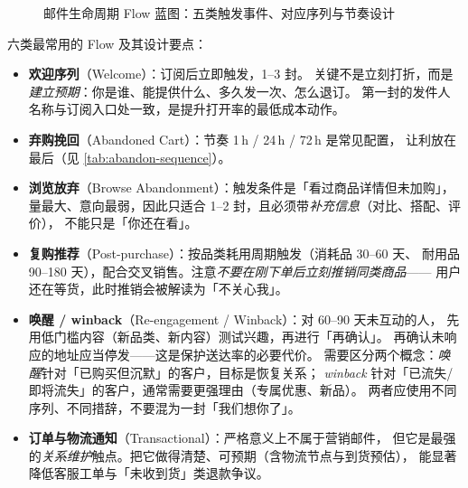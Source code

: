 \begin{figure}[htbp]
\caption{邮件生命周期 Flow 蓝图：五类触发事件、对应序列与节奏设计}
\label{fig:email-flow}
\end{figure}

六类最常用的 Flow 及其设计要点：

\begin{itemize}
  \item \textbf{欢迎序列}（Welcome）：订阅后立即触发，1--3 封。
        关键不是立刻打折，而是\emph{建立预期}：你是谁、能提供什么、多久发一次、怎么退订。
        第一封的发件人名称与订阅入口处一致，是提升打开率的最低成本动作。
  \item \textbf{弃购挽回}（Abandoned Cart）：节奏 1\,h / 24\,h / 72\,h 是常见配置，
        让利放在最后（见 \cref{tab:abandon-sequence}）。
  \item \textbf{浏览放弃}（Browse Abandonment）：触发条件是「看过商品详情但未加购」，
        量最大、意向最弱，因此只适合 1--2 封，且必须带\emph{补充信息}（对比、搭配、评价），
        不能只是「你还在看」。
  \item \textbf{复购推荐}（Post-purchase）：按品类耗用周期触发（消耗品 30--60 天、
        耐用品 90--180 天），配合交叉销售。注意\emph{不要在刚下单后立刻推销同类商品}——
        用户还在等货，此时推销会被解读为「不关心我」。
  \item \textbf{唤醒 / winback}（Re-engagement / Winback）：对 60--90 天未互动的人，
        先用低门槛内容（新品类、新内容）测试兴趣，再进行「再确认」。
        再确认未响应的地址应当停发——这是保护送达率的必要代价。
        需要区分两个概念：\emph{唤醒}针对「已购买但沉默」的客户，目标是恢复关系；
        \emph{winback} 针对「已流失/即将流失」的客户，通常需要更强理由（专属优惠、新品）。
        两者应使用不同序列、不同措辞，不要混为一封「我们想你了」。
  \item \textbf{订单与物流通知}（Transactional）：严格意义上不属于营销邮件，
        但它是最强的\emph{关系维护}触点。把它做得清楚、可预期（含物流节点与到货预估），
        能显著降低客服工单与「未收到货」类退款争议。
\end{itemize}

